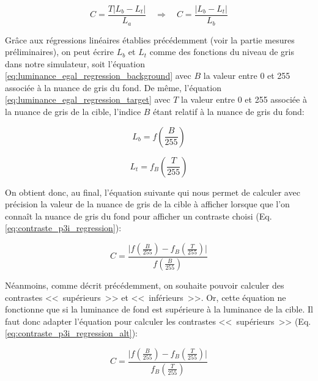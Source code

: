 	\begin{equation}
		C = \frac{T \vert L_b - L_t \vert}{L_a} \quad \Rightarrow \quad C = \frac{\vert L_b - L_t \vert}{L_b}
		\label{eq:contraste_p3i}
	\end{equation}
	
	\par Grâce aux régressions linéaires établies précédemment (voir la partie mesures préliminaires), on peut écrire $L_b$ et $L_t$ comme des fonctions du niveau de gris dans notre simulateur, soit l'équation \ref{eq:luminance_egal_regression_background} avec $B$ la valeur entre 0 et 255 associée à la nuance de gris du fond. De même, l'équation \ref{eq:luminance_egal_regression_target} avec $T$ la valeur entre 0 et 255 associée à la nuance de gris de la cible, l'indice $B$ étant relatif à la nuance de gris du fond:
	
	\begin{equation}
		L_b = f\left( \frac{B}{255} \right)
		\label{eq:luminance_egal_regression_background}
	\end{equation}
	
	\begin{equation}
		L_t = f_B\left( \frac{T}{255} \right)
		\label{eq:luminance_egal_regression_target}
	\end{equation}
	
	\par On obtient donc, au final, l'équation suivante qui nous permet de calculer avec précision la valeur de la nuance de gris de la cible à afficher lorsque que l'on connaît la nuance de gris du fond pour afficher un contraste choisi (Eq. \ref{eq:contraste_p3i_regression}):
	
	\begin{equation}
		C = \frac{\vert f\left( \frac{B}{255} \right) - f_B\left( \frac{T}{255} \right) \vert}{f\left( \frac{B}{255} \right)}
		\label{eq:contraste_p3i_regression}
	\end{equation}
	
	\par Néanmoins, comme décrit précédemment, on souhaite pouvoir calculer des contrastes <<~supérieurs~>> et <<~inférieurs~>>. Or, cette équation ne fonctionne que si la luminance de fond est supérieure à la luminance de la cible. Il faut donc adapter l'équation pour calculer les contrastes <<~supérieurs~>> (Eq. \ref{eq:contraste_p3i_regression_alt}):
	
	\begin{equation}
		C = \frac{\vert f\left( \frac{B}{255} \right) - f_B\left( \frac{T}{255} \right) \vert}{f_B\left( \frac{T}{255} \right)}
		\label{eq:contraste_p3i_regression_alt}
	\end{equation}
	
